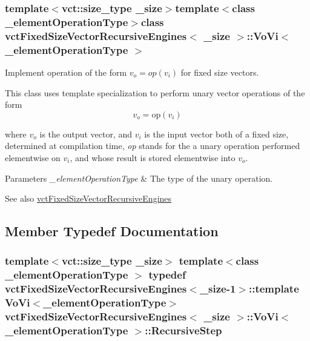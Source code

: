 \subsubsection*{template$<$vct\+::size\+\_\+type \+\_\+size$>$template$<$class \+\_\+element\+Operation\+Type$>$class vct\+Fixed\+Size\+Vector\+Recursive\+Engines$<$ \+\_\+size $>$\+::\+Vo\+Vi$<$ \+\_\+element\+Operation\+Type $>$}

Implement operation of the form $v_o = op(v_i)$ for fixed size vectors. 

This class uses template specialization to perform unary vector operations of the form \[ v_{o} = \mathrm{op}(v_{i}) \]

where $v_{o}$ is the output vector, and $v_{i}$ is the input vector both of a fixed size, determined at compilation time, {\itshape op} stands for the a unary operation performed elementwise on $v_{i}$, and whose result is stored elementwise into $v_{o}$.


\begin{DoxyParams}{Parameters}
{\em \+\_\+element\+Operation\+Type} & The type of the unary operation.\\
\hline
\end{DoxyParams}
\begin{DoxySeeAlso}{See also}
\hyperlink{classvct_fixed_size_vector_recursive_engines}{vct\+Fixed\+Size\+Vector\+Recursive\+Engines} 
\end{DoxySeeAlso}


\subsection{Member Typedef Documentation}
\hypertarget{classvct_fixed_size_vector_recursive_engines_1_1_vo_vi_ac104b8d2ed9b8652bc03c1bfd9908ff1}{}
\subsubsection[{Recursive\+Step}]{\setlength{\rightskip}{0pt plus 5cm}template$<$vct\+::size\+\_\+type \+\_\+size$>$ template$<$class \+\_\+element\+Operation\+Type $>$ typedef {\bf vct\+Fixed\+Size\+Vector\+Recursive\+Engines}$<$\+\_\+size-\/1$>$\+::template {\bf Vo\+Vi}$<$\+\_\+element\+Operation\+Type$>$ {\bf vct\+Fixed\+Size\+Vector\+Recursive\+Engines}$<$ \+\_\+size $>$\+::{\bf Vo\+Vi}$<$ \+\_\+element\+Operation\+Type $>$\+::{\bf Recursive\+Step}}\label{classvct_fixed_size_vector_recursive_engines_1_1_vo_vi_ac104b8d2ed9b8652bc03c1bfd9908ff1}


